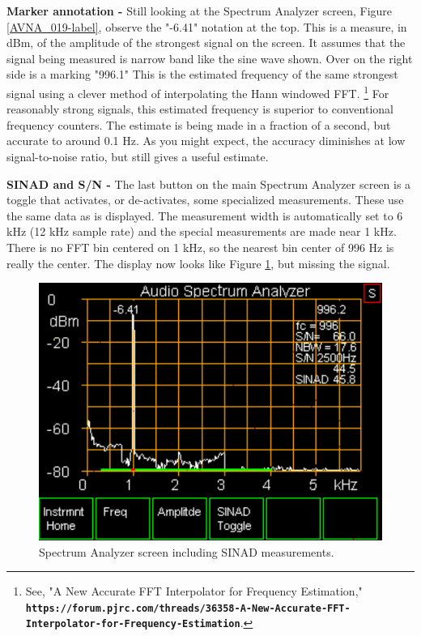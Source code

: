 \textbf{Marker annotation - }Still looking at the Spectrum Analyzer screen, Figure  \ref{AVNA_019-label},  observe the "-6.41" notation at the top.  This is a measure, in dBm, of the amplitude of the strongest signal on the screen.  It assumes that the signal being measured is narrow band like the sine wave shown.  Over on the right side is a marking "996.1"  This is the estimated frequency of the same strongest signal using a clever method of interpolating the Hann windowed FFT. 
\footnote{See, "A New Accurate FFT Interpolator for Frequency Estimation," \linebreak \textbf{\texttt{ https://forum.pjrc.com/threads/36358-A-New-Accurate-FFT-Interpolator-for-Frequency-Estimation}}. }
%
For reasonably strong signals, this estimated frequency is superior to conventional frequency counters. The estimate is being made in a fraction of a second, but accurate to around 0.1 Hz.   As you might expect, the accuracy diminishes at low signal-to-noise ratio, but still gives a useful estimate.  

\textbf{SINAD and S/N - }The last button on the main Spectrum Analyzer screen is a toggle that activates, or de-activates, some specialized measurements.  These use the same data as is displayed.  The measurement width is automatically set to 6 kHz (12 kHz sample rate) and the special measurements are made near 1 kHz.  There is no FFT bin centered on 1 kHz, so the nearest bin center of 996 Hz is really the center.  The display now looks like Figure \ref{AVNA_020-label}, but missing the signal.
%
\begin{figure}[H]
\begin{center}
\includegraphics[scale=0.75]{./images/AVNA_020.pdf}
\caption{Spectrum Analyzer screen including SINAD measurements.}
\label{AVNA_020-label}
\end{center}
\end{figure}
%

